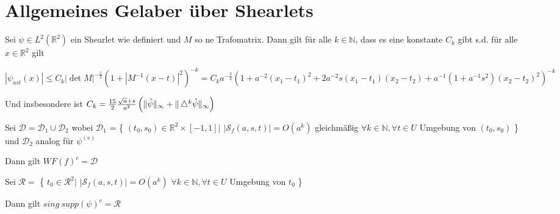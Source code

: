 \section{Allgemeines Gelaber über Shearlets} %
\label{sec:allgemeines_gelaber_ueber_shearlets}

\begin{proposition}
\label{prop:shearlets_decay_rapidly}
Sei $\psi \in L^2(\mathbb{R}^2)$ ein Shearlet wie definiert und $M$ so ne Trafomatrix. Dann gilt für alle $k \in  \mathbb{N}$, dass es eine konstante $C_k$ gibt s.d. für alle $x \in \mathbb{R}^2$ gilt

\begin{dmath*}
    \left| \psi_{ast}(x) \right|
    \leq
    C_k \left| \det M \right|^{-\frac{1}{2}}\left(1+|M^{-1}(x-t)|^2\right)^{-k}
    = C_k a^{-\frac{3}{4}}\left(1+a^{-2}\left(x_1-t_1\right)^2
        + 2 a^{-2}s\left(x_1-t_1\right)\left(x_2-t_2\right)
        + a^{-1}\left(1+a^{-1}s^2\right)\left(x_2-t_2\right)^2
    \right)^{-k}
\end{dmath*}

Und insbesondere ist $C_k = \frac{15}{2}\frac{\sqrt{a} + s}{a^2}\left(\Vert \hat\psi \Vert_\infty + \Vert \mathop{}\!\mathbin\bigtriangleup^k \hat\psi \Vert_\infty\right)$

\end{proposition}

\begin{theorem}
\label{thm:main_theorem}
    Sei $\mathcal{D} = \mathcal{D}_1 \cup \mathcal{D}_2$ wobei
    $\mathcal{D}_1$ = \{
        $(t_0, s_0) \in \mathbb{R}^2 \times [-1,1] \big|$
        $|\mathcal{S}_f (a, s, t)| = O(a^k)$ gleichmäßig $\forall k \in \mathbb{N}
        , \forall t \in U$ Umgebung von $(t_0, s_0)$
    \}
    und $\mathcal{D}_2$ analog für $\psi^{(v)}$

    Dann gilt $WF(f)^c = \mathcal{D}$
\end{theorem}


\begin{corollary}
Sei $\mathcal{R} =$ \{
    $t_0 \in \mathcal{R}^2 \big|$ $|\mathcal{S}_f(a,s,t)| = O(a^k)$
    $\forall k \in \mathbb{N}, \forall t \in U$ Umgebung von $t_0$
    \}

    Dann gilt $sing ~supp (\psi)^c = \mathcal{R}$
\end{corollary}

